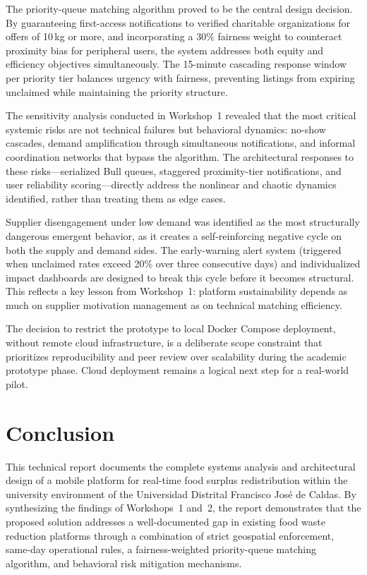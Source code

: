 \documentclass[conference]{IEEEtran}
\begin{document}
The priority-queue matching algorithm proved to be the central design decision. By guaranteeing first-access notifications to verified charitable organizations for offers of 10\,kg or more, and incorporating a 30\% fairness weight to counteract proximity bias for peripheral users, the system addresses both equity and efficiency objectives simultaneously. The 15-minute cascading response window per priority tier balances urgency with fairness, preventing listings from expiring unclaimed while maintaining the priority structure.

The sensitivity analysis conducted in Workshop~1 revealed that the most critical systemic risks are not technical failures but behavioral dynamics: no-show cascades, demand amplification through simultaneous notifications, and informal coordination networks that bypass the algorithm. The architectural responses to these risks---serialized Bull queues, staggered proximity-tier notifications, and user reliability scoring---directly address the nonlinear and chaotic dynamics identified, rather than treating them as edge cases.

Supplier disengagement under low demand was identified as the most structurally dangerous emergent behavior, as it creates a self-reinforcing negative cycle on both the supply and demand sides. The early-warning alert system (triggered when unclaimed rates exceed 20\% over three consecutive days) and individualized impact dashboards are designed to break this cycle before it becomes structural. This reflects a key lesson from Workshop~1: platform sustainability depends as much on supplier motivation management as on technical matching efficiency.

The decision to restrict the prototype to local Docker Compose deployment, without remote cloud infrastructure, is a deliberate scope constraint that prioritizes reproducibility and peer review over scalability during the academic prototype phase. Cloud deployment remains a logical next step for a real-world pilot.

\section{Conclusion}

This technical report documents the complete systems analysis and architectural design of a mobile platform for real-time food surplus redistribution within the university environment of the Universidad Distrital Francisco José de Caldas. By synthesizing the findings of Workshops~1 and~2, the report demonstrates that the proposed solution addresses a well-documented gap in existing food waste reduction platforms through a combination of strict geospatial enforcement, same-day operational rules, a fairness-weighted priority-queue matching algorithm, and behavioral risk mitigation mechanisms.
\end{document}
